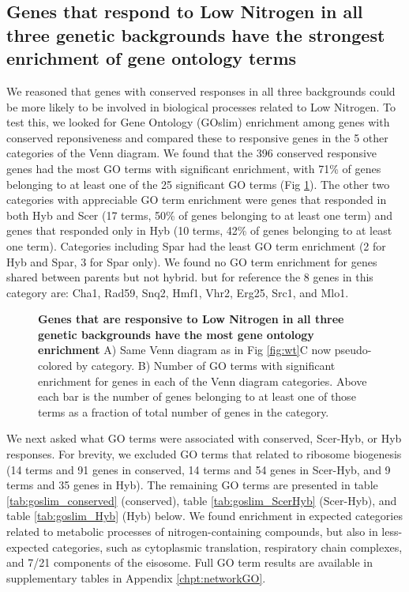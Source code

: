 \subsection{Genes that respond to Low Nitrogen in all three genetic backgrounds have the strongest enrichment of gene ontology terms}

We reasoned that genes with conserved responses in all three backgrounds could be more likely to be involved in biological processes related to Low Nitrogen. To test this, we looked for Gene Ontology (GOslim) enrichment among genes with conserved reponsiveness and compared these to responsive genes in the 5 other categories of the Venn diagram. We found that the 396 conserved responsive genes had the most GO terms with significant enrichment, with 71\% of genes belonging to at least one of the 25 significant GO terms (Fig \ref{fig:GO}). The other two categories with appreciable GO term enrichment were genes that responded in both Hyb and Scer (17 terms, 50\% of genes belonging to at least one term) and genes that responded only in Hyb (10 terms, 42\% of genes belonging to at least one term). Categories including Spar had the least GO term enrichment (2 for Hyb and Spar, 3 for Spar only). We found no GO term enrichment for genes shared between parents but not hybrid. but for reference the 8 genes in this category are: Cha1, Rad59, Snq2, Hmf1, Vhr2, Erg25, Src1, and Mlo1.
\begin{figure}
    \centering
    \caption{\textbf{Genes that are responsive to Low Nitrogen in all three genetic backgrounds have the most gene ontology enrichment} A) Same Venn diagram as in Fig \ref{fig:wt}C now pseudo-colored by category. B) Number of GO terms with significant enrichment for genes in each of the Venn diagram categories. Above each bar is the number of genes belonging to at least one of those terms as a fraction of total number of genes in the category.}
    \label{fig:GO}
\end{figure}

We next asked what GO terms were associated with conserved, Scer-Hyb, or Hyb responses. For brevity, we excluded GO terms that related to ribosome biogenesis (14 terms and 91 genes in conserved, 14 terms and 54 genes in Scer-Hyb, and 9 terms and 35 genes in Hyb). The remaining GO terms are presented in table \ref{tab:goslim_conserved} (conserved), table \ref{tab:goslim_ScerHyb} (Scer-Hyb), and table \ref{tab:goslim_Hyb} (Hyb) below. We found enrichment in expected categories related to metabolic processes of nitrogen-containing compounds, but also in less-expected categories, such as cytoplasmic translation, respiratory chain complexes, and 7/21 components of the eisosome. Full GO term results are available in supplementary tables in Appendix \ref{chpt:networkGO}.


